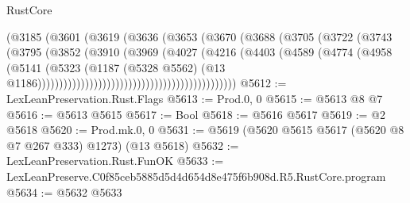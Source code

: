 \begin{lexlean}{RustCore}
\begin{coremodule}
                                                (@3185
                                                  (@3601
                                                    (@3619
                                                      (@3636
                                                        (@3653
                                                          (@3670
                                                            (@3688
                                                              (@3705
                                                                (@3722
                                                                  (@3743
                                                                    (@3795
                                                                      (@3852
                                                                        (@3910
                                                                          (@3969
                                                                            (@4027
                                                                              (@4216
                                                                                (@4403
                                                                                  (@4589
                                                                                    (@4774
                                                                                      (@4958
                                                                                        (@5141
                                                                                          (@5323
                                                                                            (@1187
                                                                                              (@5328
                                                                                                @5562)
                                                                                              (@13
                                                                                                @1186))))))))))))))))))))))))))))))))))))))))))))))
@5612 := LexLeanPreservation.Rust.Flags
@5613 := Prod.{0, 0}
@5615 := @5613 @8 @7
@5616 := @5613 @5615
@5617 := Bool
@5618 := @5616 @5617
@5619 := @2 @5618
@5620 := Prod.mk.{0, 0}
@5631 := @5619 (@5620 @5615 @5617 (@5620 @8 @7 @267 @333) @1273) (@13 @5618)
@5632 := LexLeanPreservation.Rust.FunOK
@5633 := LexLeanPreserve.C0f85ceb5885d5d4d654d8e475f6b908d.R5.RustCore.program
@5634 := @5632 @5633

\end{coremodule}
\end{lexlean}

